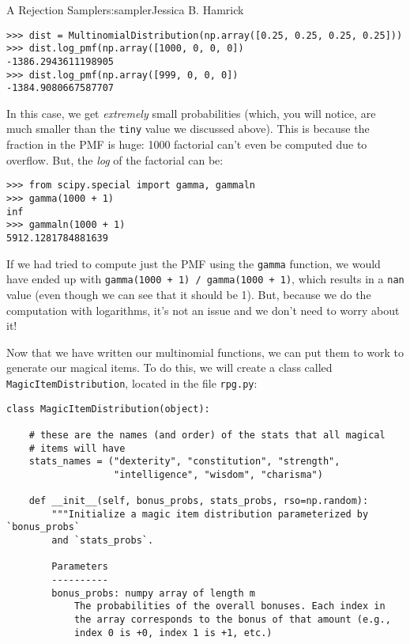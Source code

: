 \begin{aosachapter}{A Rejection Sampler}{s:sampler}{Jessica B. Hamrick}
\begin{verbatim}
>>> dist = MultinomialDistribution(np.array([0.25, 0.25, 0.25, 0.25]))
>>> dist.log_pmf(np.array([1000, 0, 0, 0])
-1386.2943611198905
>>> dist.log_pmf(np.array([999, 0, 0, 0])
-1384.9080667587707
\end{verbatim}

In this case, we get \emph{extremely} small probabilities (which, you
will notice, are much smaller than the \texttt{tiny} value we discussed
above). This is because the fraction in the PMF is huge: 1000 factorial
can't even be computed due to overflow. But, the \emph{log} of the
factorial can be:

\begin{verbatim}
>>> from scipy.special import gamma, gammaln
>>> gamma(1000 + 1)
inf
>>> gammaln(1000 + 1)
5912.1281784881639
\end{verbatim}

If we had tried to compute just the PMF using the \texttt{gamma}
function, we would have ended up with
\texttt{gamma(1000 + 1) / gamma(1000 + 1)}, which results in a
\texttt{nan} value (even though we can see that it should be 1). But,
because we do the computation with logarithms, it's not an issue and we
don't need to worry about it!

\label{sampling-magical-items-revisited}

Now that we have written our multinomial functions, we can put them to
work to generate our magical items. To do this, we will create a class
called \texttt{MagicItemDistribution}, located in the file
\texttt{rpg.py}:

\begin{verbatim}
class MagicItemDistribution(object):

    # these are the names (and order) of the stats that all magical
    # items will have
    stats_names = ("dexterity", "constitution", "strength",
                   "intelligence", "wisdom", "charisma")

    def __init__(self, bonus_probs, stats_probs, rso=np.random):
        """Initialize a magic item distribution parameterized by `bonus_probs`
        and `stats_probs`.

        Parameters
        ----------
        bonus_probs: numpy array of length m
            The probabilities of the overall bonuses. Each index in
            the array corresponds to the bonus of that amount (e.g.,
            index 0 is +0, index 1 is +1, etc.)


\end{verbatim}
\end{aosachapter}
